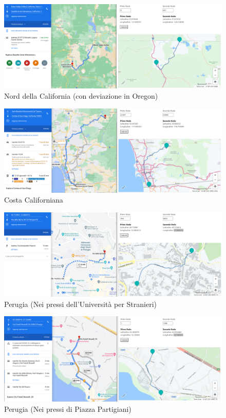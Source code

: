 \documentclass[12pt,a4paper]{report}
\begin{document}
\begin{center}
	\begin{figure}[H]
		\includegraphics[width=1.05\textwidth]{img/es1.png}
		\caption{Nord della California (con deviazione in Oregon)}
	\end{figure}

	\begin{figure}[H]
		\includegraphics[width=1.05\textwidth]{img/es2.png}
		\caption{Costa Californiana}
	\end{figure}
\bigskip\bigskip\bigskip\bigskip
	\begin{figure}[H]
		\includegraphics[width=1.05\textwidth]{img/es3.png}
		\caption{Perugia (Nei pressi dell'Università per Stranieri)}
	\end{figure}

	\begin{figure}[H]
		\includegraphics[width=1.05\textwidth]{img/es4.png}
		\caption{Perugia (Nei pressi di Piazza Partigiani)}
	\end{figure}
\end{center}
\end{document}
